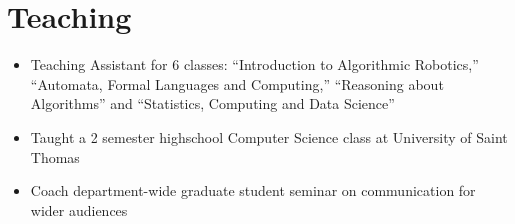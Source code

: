 \section{Teaching}

\vspace{6pt}
 
\begin{itemize}

\item[]{Teaching Assistant for 6 classes: ``Introduction to Algorithmic Robotics,'' ``Automata, Formal Languages and Computing,'' ``Reasoning about Algorithms'' and ``Statistics, Computing and Data Science''}

\vspace{6pt}

\item[]{Taught a 2 semester highschool Computer Science class at University of Saint Thomas}

\vspace{6pt}

\item[]{Coach department-wide graduate student seminar on communication for wider audiences}

\end{itemize}